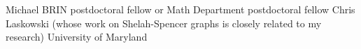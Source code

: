 \documentclass[11pt]{letter}
\begin{document}





\coverletter
  {\umaryland}
  {}
  {Michael BRIN postdoctoral fellow or Math Department postdoctoral fellow}
  {\mathjobs}
  {Chris Laskowski (whose work on Shelah-Spencer graphs is closely related to my research)}
  {University of Maryland}
  {\generic}
\end{document}
